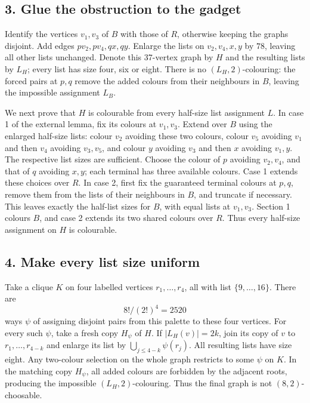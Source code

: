 \subsection*{3. Glue the obstruction to the gadget}
Identify the vertices $v_1,v_3$ of $B$ with those of $R$, otherwise keeping the graphs disjoint. Add edges $pv_2,pv_4,qx,qy$. Enlarge the lists on $v_2,v_4,x,y$ by $78$, leaving all other lists unchanged. Denote this 37-vertex graph by $H$ and the resulting lists by $L_H$; every list has size four, six or eight.
There is no $(L_H,2)$-colouring: the forced pairs at $p,q$ remove the added colours from their neighbours in $B$, leaving the impossible assignment $L_B$.

We next prove that $H$ is colourable from every half-size list assignment $L$. In case 1 of the external lemma, fix its colours at $v_1,v_3$. Extend over $B$ using the enlarged half-size lists: colour $v_2$ avoiding these two colours, colour $v_5$ avoiding $v_1$ and then $v_4$ avoiding $v_3,v_5$, and colour $y$ avoiding $v_3$ and then $x$ avoiding $v_1,y$. The respective list sizes are sufficient. Choose the colour of $p$ avoiding $v_2,v_4$, and that of $q$ avoiding $x,y$; each terminal has three available colours. Case 1 extends these choices over $R$.
In case 2, first fix the guaranteed terminal colours at $p,q$, remove them from the lists of their neighbours in $B$, and truncate if necessary. This leaves exactly the half-list sizes for $B$, with equal lists at $v_1,v_3$. Section 1 colours $B$, and case 2 extends its two shared colours over $R$. Thus every half-size assignment on $H$ is colourable.

\subsection*{4. Make every list size uniform}
Take a clique $K$ on four labelled vertices $r_1,\ldots,r_4$, all with list $\{9,\ldots,16\}$. There are
\[
 8!/(2!)^4=2520
\]
ways $\psi$ of assigning disjoint pairs from this palette to these four vertices. For every such $\psi$, take a fresh copy $H_\psi$ of $H$. If $|L_H(v)|=2k$, join its copy of $v$ to $r_1,\ldots,r_{4-k}$ and enlarge its list by $\bigcup_{j\le4-k}\psi(r_j)$. All resulting lists have size eight.
Any two-colour selection on the whole graph restricts to some $\psi$ on $K$. In the matching copy $H_\psi$, all added colours are forbidden by the adjacent roots, producing the impossible $(L_H,2)$-colouring. Thus the final graph is not $(8,2)$-choosable.


